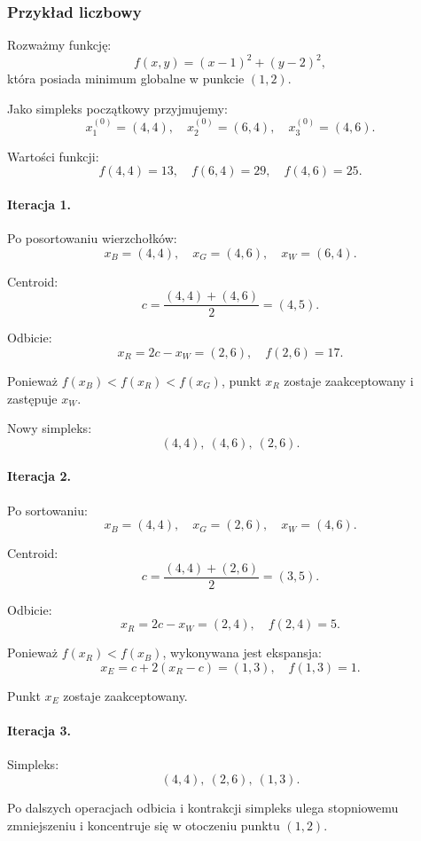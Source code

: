 \documentclass[10pt,a4paper]{article}
\begin{document}
\subsubsection{Przykład liczbowy}

Rozważmy funkcję:
\[
f(x,y) = (x-1)^2 + (y-2)^2,
\]
która posiada minimum globalne w punkcie $(1,2)$.

Jako simpleks początkowy przyjmujemy:
\[
x_1^{(0)}=(4,4), \quad
x_2^{(0)}=(6,4), \quad
x_3^{(0)}=(4,6).
\]

Wartości funkcji:
\[
f(4,4)=13, \quad f(6,4)=29, \quad f(4,6)=25.
\]



\paragraph{Iteracja 1.}

Po posortowaniu wierzchołków:
\[
x_B=(4,4), \quad x_G=(4,6), \quad x_W=(6,4).
\]

Centroid:
\[
c = \frac{(4,4)+(4,6)}{2} = (4,5).
\]

Odbicie:
\[
x_R = 2c - x_W = (2,6),
\quad f(2,6)=17.
\]

Ponieważ $f(x_B) < f(x_R) < f(x_G)$, punkt $x_R$ zostaje zaakceptowany
i zastępuje $x_W$.

Nowy simpleks:
\[
(4,4),\ (4,6),\ (2,6).
\]



\paragraph{Iteracja 2.}

Po sortowaniu:
\[
x_B=(4,4), \quad x_G=(2,6), \quad x_W=(4,6).
\]

Centroid:
\[
c = \frac{(4,4)+(2,6)}{2} = (3,5).
\]

Odbicie:
\[
x_R = 2c - x_W = (2,4),
\quad f(2,4)=5.
\]

Ponieważ $f(x_R) < f(x_B)$, wykonywana jest ekspansja:
\[
x_E = c + 2(x_R - c) = (1,3),
\quad f(1,3)=1.
\]

Punkt $x_E$ zostaje zaakceptowany.



\paragraph{Iteracja 3.}

Simpleks:
\[
(4,4),\ (2,6),\ (1,3).
\]

Po dalszych operacjach odbicia i kontrakcji simpleks ulega stopniowemu
zmniejszeniu i koncentruje się w otoczeniu punktu $(1,2)$.
\end{document}
